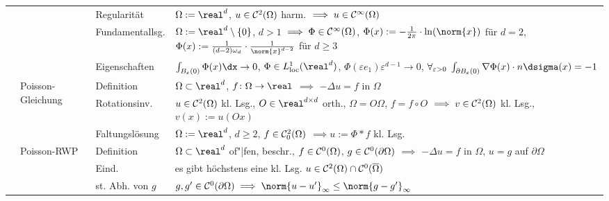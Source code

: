 \begin{landscape}
\begin{tabular}{p{20mm}p{20mm}p{30mm}p{169mm}}
        &&Regularität&
        $\Omega := \real^d$, $u \in \mathcal{C}^2(\Omega)$ harm.
        $\implies u \in \mathcal{C}^\infty(\Omega)$\\

        &&Fundamentallsg.&
        $\Omega := \real^d \setminus \{0\}$, $d > 1$
        $\implies \Phi \in \mathcal{C}^\infty(\Omega)$,
        $\Phi(x) := -\frac{1}{2\pi} \cdot \ln(\norm{x})$ für $d = 2$,\quad
        $\Phi(x) := \frac{1}{(d-2)\omega_d} \cdot \frac{1}{\norm{x}^{d-2}}$ für $d \ge 3$\\

        &&Eigenschaften&
        $\int_{B_\varepsilon(0)} \Phi(x)\dx \to 0$,\quad
        $\Phi \in L^1_\loc(\real^d)$,\quad
        $\Phi(\varepsilon e_1) \varepsilon^{d-1} \to 0$,\quad
        $\forall_{\varepsilon>0}\;
        \int_{\partial B_\varepsilon(0)} \nabla\Phi(x) \cdot n\dsigma(x) = -1$\\

        \cmidrule{2-4}

        &\multirow{3}{20mm}{Poisson-Gleichung}&
        Definition&
        $\Omega \subset \real^d$, $f\colon \Omega \to \real$
        $\implies$
        $-\Delta u = f$ in $\Omega$\\

        &&Rotationsinv.&
        $u \in \mathcal{C}^2(\Omega)$ kl. Lsg.,
        $O \in \real^{d \times d}$ orth., $\Omega = O\Omega$, $f = f \circ O$
        $\implies v \in \mathcal{C}^2(\Omega)$ kl. Lsg., $v(x) := u(Ox)$\\

        &&Faltungslösung&
        $\Omega := \real^d$, $d \ge 2$, $f \in \mathcal{C}^2_0(\Omega)$
        $\implies u := \Phi \ast f$ kl. Lsg.\\

        \cmidrule{2-4}

        &\multirow{4}{20mm}{Poisson-RWP}&
        Definition&
        $\Omega \subset \real^d$ of"|fen, beschr., $f \in \mathcal{C}^0(\Omega)$,
        $g \in \mathcal{C}^0(\partial\Omega)$
        $\implies$
        $-\Delta u = f$ in $\Omega$, $u = g$ auf $\partial\Omega$\\

        &&Eind.&
        es gibt höchstens eine kl. Lsg. $u \in \mathcal{C}^2(\Omega) \cap \mathcal{C}^0(\overline{\Omega})$\\

        &&st. Abh. von $g$&
        $g, g' \in \C^0(\partial\Omega)
        \implies \norm{u - u'}_\infty \le \norm{g - g'}_\infty$\\


\end{tabular}
\end{landscape}
